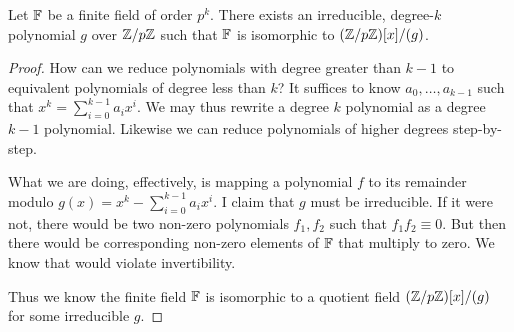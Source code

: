 \begin{lemma}
  Let $\mathbb{F}$ be a finite field of order $p^k$. There exists an
  irreducible, degree-$k$ polynomial $g$ over $\mathbb{Z} / p\mathbb{Z}$ such that $\mathbb{F}$ is
  isomorphic to $\mathopen{}\left( {\mathbb{Z} / p\mathbb{Z}} \right)\mathclose{}[x]/(g)$.
\end{lemma}

\begin{proof}
  How can we reduce polynomials with degree greater than $k-1$ to
  equivalent polynomials of degree less than $k$? It suffices to know
  $a_0, \ldots, a_{k-1}$ such that $x^k = \sum_{i=0}^{k-1} a_i x^i$. We
  may thus rewrite a degree $k$ polynomial as a degree $k-1$ polynomial.
  Likewise we can reduce polynomials of higher degrees step-by-step.

  What we are doing, effectively, is mapping a polynomial $f$ to its
  remainder modulo $g(x) = x^k - \sum_{i=0}^{k-1} a_i x^i$. I claim that
  $g$ must be irreducible. If it were not, there would be two non-zero
  polynomials $f_1, f_2$ such that $f_1 f_2 \equiv 0$. But then there
  would be corresponding non-zero elements of $\mathbb{F}$ that multiply to
  zero. We know that would violate invertibility.

  Thus we know the finite field $\mathbb{F}$ is isomorphic to a quotient field
  $\mathopen{}\left( {\mathbb{Z} / p\mathbb{Z}} \right)\mathclose{}[x]/(g)$ for some irreducible $g$.
\end{proof}
